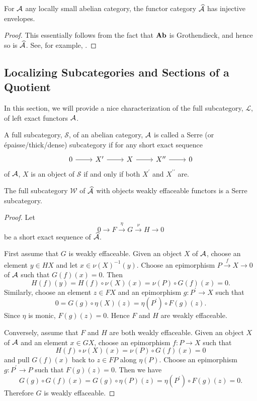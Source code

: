 \documentclass[reqno, 12pt]{amsart}
\begin{document}
\begin{proposition}
  For $\mathcal{A}$ any locally small abelian category, the functor category $\widehat{\mathcal{A}}$ has injective envelopes.
\end{proposition}

\begin{proof}
  This essentially follows from the fact that $\operatorname{\bf Ab}$ is Grothendieck, and hence so is $\widehat{\mathcal{A}}$.  See, for example, \cite[Section 9.6]{KaSch05}.
\end{proof}

\subsection{Localizing Subcategories and Sections of a Quotient}
In this section, we will provide a nice characterization of the full subcategory, $\mathcal{L}$, of left exact functors $\mathcal{\mathcal{A}}$.

\begin{definition}
  A full subcategory, $\mathcal{S}$, of an abelian category, $\mathcal{A}$ is called a Serre (or \'{e}paisse/thick/dense) subcategory if for any short exact sequence
  $$\begin{tikzcd}
    0 \arrow{r} & X^\prime \arrow{r} & X \arrow{r} & X^{\prime\prime} \arrow{r} & 0
  \end{tikzcd}$$
  of $\mathcal{A}$, $X$ is an object of $\mathcal{S}$ if and only if both $X^\prime$ and $X^{\prime\prime}$ are.
\end{definition}

\begin{proposition}
  The full subcategory $\mathcal{W}$ of $\widehat{\mathcal{A}}$ with objects weakly effaceable functors is a Serre subcategory.
\end{proposition}

\begin{proof}
  Let
  $$0 \to F \overset{\eta}\to G \overset{\nu} \to H \to 0$$
  be a short exact sequence of $\widehat{\mathcal{A}}$.

  First assume that $G$ is weakly effaceable.
  Given an object $X$ of $\mathcal{A}$, choose an element $y \in HX$ and let $x \in \nu(X)^{-1}(y)$.
  Choose an epimorphism $P \overset{f}\to X \to 0$ of $\mathcal{A}$ such that $G(f)(x) = 0$.
  Then
  $$H(f)(y) = H(f) \circ \nu(X) (x) = \nu(P) \circ G(f)(x) = 0.$$
  Similarly, choose an element $z \in FX$ and an epimorphism $g \colon P^\prime \to X$ such that
  $$0 = G(g) \circ \eta(X)(z) = \eta(P^\prime) \circ F(g)(z).$$
  Since $\eta$ is monic, $F(g)(z) = 0$.
  Hence $F$ and $H$ are weakly effaceable.

  Conversely, assume that $F$ and $H$ are both weakly effaceable.
  Given an object $X$ of $\mathcal{A}$ and an element $x \in GX$, choose an epimorphism $f \colon P \to X$ such that
  $$H(f) \circ \nu(X)(x) = \nu(P) \circ G(f)(x) = 0$$
  and pull $G(f)(x)$ back to $z \in FP$ along $\eta(P)$.
  Choose an epimorphism $g \colon P^\prime \to P$ such that $F(g)(z) = 0$.
  Then we have
  $$G(g) \circ G(f)(x) = G(g) \circ \eta(P)(z) = \eta(P^\prime) \circ F(g)(z) = 0.$$
  Therefore $G$ is weakly effaceable.
\end{proof}
\end{document}
